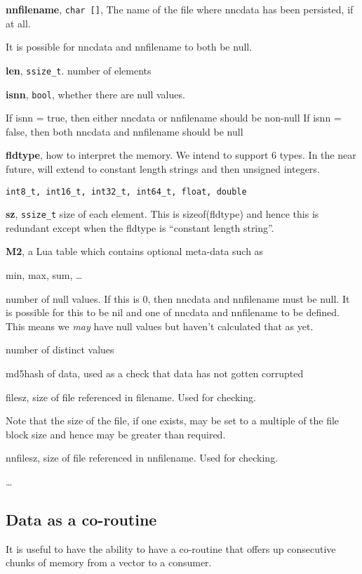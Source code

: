 \item {\bf nnfilename}, \verb+char []+, The name of the file where nncdata has been
persisted, if at all. 

It is possible for nncdata and nnfilename to both be null.
\item {\bf len}, \verb+ssize_t+. number of elements
\item {\bf isnn}, \verb+bool+, whether there are null values. 

If isnn = true, then either nncdata or nnfilename should be non-null
If isnn = false, then both nncdata and nnfilename should be null
\item {\bf fldtype}, how to interpret the memory. We intend to support 6 types.
In the near  future, will extend to constant length strings and then unsigned integers. 
\begin{verbatim}
int8_t, int16_t, int32_t, int64_t, float, double
\end{verbatim}

\item {\bf sz}, \verb+ssize_t+ size of each element. This is sizeof(fldtype) and
hence this is redundant except when the fldtype is ``constant length
string''.
\ee
\item {\bf M2}, a Lua table which contains optional meta-data such as 
\be
\item min, max, sum, \ldots
\item number of null values. If this is 0, then nncdata and nnfilename must be
null. It is possible for this to be nil and one of nncdata and nnfilename to be
defined. This means we {\em may} have null values but haven't calculated that as
yet. 
\item number of distinct values
\item md5hash of data, used as a check that data has not gotten corrupted
\item filesz, size of file referenced in filename. Used for checking.

Note that the size of the file, if one exists, may be set to a
multiple of the file block size and hence may be greater than
required.
\item nnfilesz, size of file referenced in nnfilename. Used for checking.
\item \ldots
\ee


\ee

\subsection{Data as a co-routine}
\label{data_coroutine}
It is useful to have the ability to have a co-routine that offers up
consecutive chunks of memory from a vector to a consumer. 


